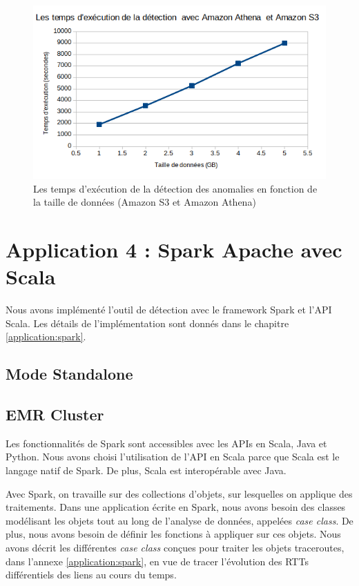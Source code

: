 \begin{figure}[H]
	\centering
	\captionsetup{justification=centering}
	\includegraphics[width=0.7\linewidth]{illustrations/temps-avec-aws_1}
	\caption{Les temps d'exécution de la détection des anomalies en fonction de la taille de données (Amazon S3 et Amazon Athena)}
	\label{fig:temps-avec-aws}
\end{figure}


\section{Application 4 : Spark Apache avec Scala}
Nous avons implémenté l'outil de détection avec le framework Spark et l'API Scala. Les détails de l'implémentation sont donnés dans le chapitre \ref{application:spark}. 

\subsection{Mode Standalone}


\subsection{EMR Cluster}

Les fonctionnalités de Spark sont accessibles avec les  APIs en Scala, Java et Python. Nous avons choisi l'utilisation de l'API en Scala parce que Scala est le langage natif de Spark. De plus, Scala est interopérable avec Java.  

Avec Spark, on travaille sur des collections d'objets, sur lesquelles on applique des traitements. Dans une application écrite en Spark, nous avons besoin des classes modélisant les objets tout au long de l'analyse de données, appelées \textit{case class}. De plus, nous avons besoin de définir les fonctions à appliquer  sur ces objets. Nous avons décrit les différentes \textit{case class} conçues pour traiter les objets traceroutes, dans l'annexe \ref{application:spark}, en vue de tracer l'évolution des RTTs différentiels des liens au cours du temps. 

